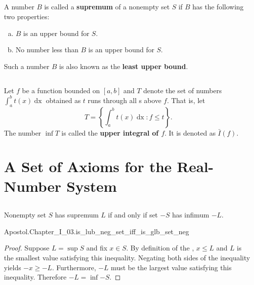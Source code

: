 \documentclass{report}
\begin{document}
\section{}%

  A number $B$ is called a \textbf{supremum} of a nonempty set $S$ if $B$ has
    the following two properties:
    \begin{enumerate}[(a)]
      \item $B$ is an upper bound for $S$.
      \item No number less than $B$ is an upper bound for $S$.
    \end{enumerate}
  Such a number $B$ is also known as the \textbf{least upper bound}.


\section{}%

  Let $f$ be a function bounded on $[a, b]$ and $T$ denote the set of numbers
    $\int_a^b t(x) \mathop{dx}$ obtained as $t$ runs through all
    s above $f$.
  That is, let $$T = \left\{ \int_a^b t(x) \mathop{dx} : f \leq t \right\}.$$
  The number $\inf{T}$ is called the \textbf{upper integral of $f$}.
  It is denoted as $\bar{I}(f)$.

\endgroup

\chapter{A Set of Axioms for the Real-Number System}%

\section{}%

  \begin{lemma}[1]
    Nonempty set $S$ has supremum $L$ if and only if set $-S$ has infimum $-L$.
  \end{lemma}

    {Apostol.Chapter\_I\_03.is\_lub\_neg\_set\_iff\_is\_glb\_set\_neg}

  \begin{proof}
    Suppose $L = \sup{S}$ and fix $x \in S$.
    By definition of the , $x \leq L$ and $L$ is the
      smallest value satisfying this inequality.
    Negating both sides of the inequality yields $-x \geq -L$.
    Furthermore, $-L$ must be the largest value satisfying this inequality.
    Therefore $-L = \inf{-S}$.
  \end{proof}
\end{document}

